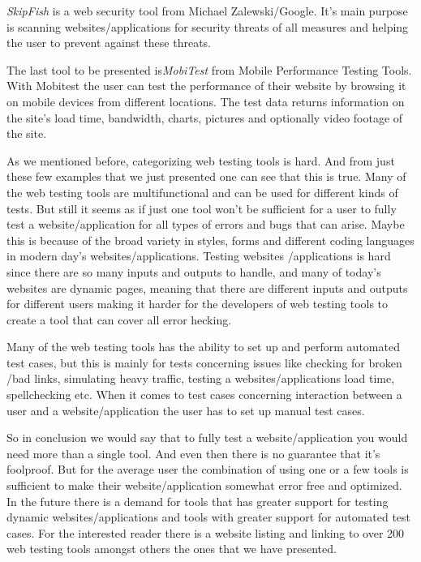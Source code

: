 \documentclass[a4paper]{article}
\begin{document}
\emph {SkipFish} is a web security tool from Michael Zalewski/Google. It's main purpose is scanning websites/applications for 
security threats of all measures and helping the user to prevent against these threats. \cite{skipfish}
 
The last tool to be presented is\emph {MobiTest} from Mobile Performance Testing Tools.  With Mobitest the user can test the 
performance of their website by browsing it on mobile devices from different locations. The test data returns information 
on the site’s load time, bandwidth, charts, pictures and optionally video footage of the site. \cite{mobitest} 
 
 
As we mentioned before, categorizing web testing tools is hard. And from just these few examples that we just presented 
one can see that this is true. Many of the web testing tools are multifunctional and can be used for different kinds of 
tests. But still it seems as if just one tool won’t be sufficient for a user to fully test a website/application for all 
types of errors and bugs that can arise. Maybe this is because of the broad variety in styles, forms and different coding 
languages in modern day’s websites/applications.  Testing websites /applications is hard since there are so many inputs 
and outputs to handle, and many of today’s websites are dynamic pages, meaning that there are different inputs and outputs 
for different users making it harder for the developers of web testing tools to create a tool that can cover all error hecking.
  
Many of the web testing tools has the ability to set up and perform automated test cases, but this is mainly for tests 
concerning issues like checking for broken /bad links, simulating heavy traffic, testing a websites/applications load 
time, spellchecking etc. When it comes to test cases concerning interaction between a user and a website/application 
the user has to set up manual test cases.   
 
So in conclusion we would say that to fully test a website/application you would need more than a single tool. And even then 
there is no guarantee that it’s foolproof.  But for the average user the combination of using one or a few tools is 
sufficient to make their website/application somewhat error free and optimized. In the future there is a demand for tools 
that has greater support for testing dynamic websites/applications and tools with greater support for automated test cases.  
For the interested reader there is a website listing and linking to over 200 web testing tools amongst others the ones that
we have presented. \cite{softqa}
\end{document}
